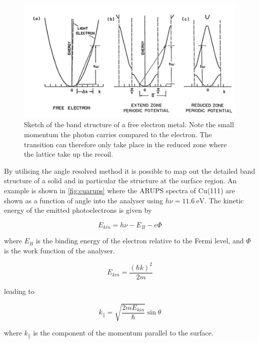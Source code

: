 \begin{figure}[h!]
	\begin{center}
	\includegraphics[scale=4]{figures/05_03.png}
	\caption{Sketch of the band structure of a free electron metal. Note the small momentum the photon carries compared to the electron. The transition can therefore only take place in the reduced zone where the lattice take up the recoil.}
	\label{fig:bandstructure}
	\end{center}
\end{figure}

By utilising the angle resolved method it is possible to map out the detailed band structure of a solid and in particular the structure at the surface region. An example is shown in \autoref{fig:cuarups} where the ARUPS spectra of Cu(111) are shown as a function of angle into the analyser using $h\nu=\SI{11.6}{\electronvolt}$.  The kinetic energy of the emitted  photoelectrons is given by

\begin{equation}
E_{kin}=h\nu-E_B-e\Phi
\end{equation}

\noindent where $E_B$ is the binding energy of the electron relative to the Fermi level, and $\Phi$ is the work function of the analyser.

\begin{equation}
E_{kin}=\frac{(\hbar k)^2}{2m}
\end{equation}

\noindent leading to 

\begin{equation}
k_\parallel=\sqrt{\frac{2mE_{kin}}{\hbar}}\sin \theta
\end{equation}

\noindent where $k_\parallel$  is the component of the momentum parallel to the surface.

